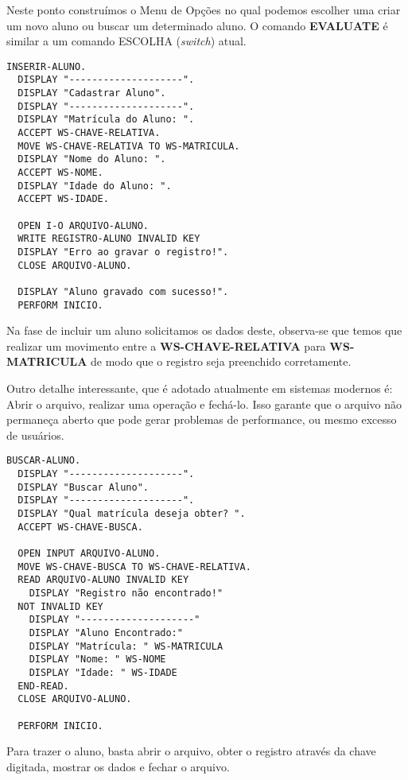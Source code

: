 Neste ponto construímos o Menu de Opções no qual podemos escolher uma criar um novo aluno ou buscar um determinado aluno. O comando \textbf{EVALUATE} é similar a um comando ESCOLHA (\textit{switch}) atual.

\begin{lstlisting}[]
INSERIR-ALUNO.
  DISPLAY "--------------------".
  DISPLAY "Cadastrar Aluno".
  DISPLAY "--------------------".
  DISPLAY "Matrícula do Aluno: ".
  ACCEPT WS-CHAVE-RELATIVA.
  MOVE WS-CHAVE-RELATIVA TO WS-MATRICULA.
  DISPLAY "Nome do Aluno: ".
  ACCEPT WS-NOME.
  DISPLAY "Idade do Aluno: ".
  ACCEPT WS-IDADE.

  OPEN I-O ARQUIVO-ALUNO.
  WRITE REGISTRO-ALUNO INVALID KEY
  DISPLAY "Erro ao gravar o registro!".
  CLOSE ARQUIVO-ALUNO.

  DISPLAY "Aluno gravado com sucesso!".
  PERFORM INICIO.	
\end{lstlisting}

Na fase de incluir um aluno solicitamos os dados deste, observa-se que temos que realizar um movimento entre a \textbf{WS-CHAVE-RELATIVA} para \textbf{WS-MATRICULA} de modo que o registro seja preenchido corretamente.

Outro detalhe interessante, que é adotado atualmente em sistemas modernos é: Abrir o arquivo, realizar uma operação e fechá-lo. Isso garante que o arquivo não permaneça aberto que pode gerar problemas de performance, ou mesmo excesso de usuários.

\begin{lstlisting}[]
BUSCAR-ALUNO.
  DISPLAY "--------------------".
  DISPLAY "Buscar Aluno".
  DISPLAY "--------------------".
  DISPLAY "Qual matrícula deseja obter? ".
  ACCEPT WS-CHAVE-BUSCA.

  OPEN INPUT ARQUIVO-ALUNO.
  MOVE WS-CHAVE-BUSCA TO WS-CHAVE-RELATIVA.
  READ ARQUIVO-ALUNO INVALID KEY
    DISPLAY "Registro não encontrado!"
  NOT INVALID KEY
    DISPLAY "--------------------"
    DISPLAY "Aluno Encontrado:"
    DISPLAY "Matrícula: " WS-MATRICULA
    DISPLAY "Nome: " WS-NOME
    DISPLAY "Idade: " WS-IDADE
  END-READ.
  CLOSE ARQUIVO-ALUNO.

  PERFORM INICIO.	
\end{lstlisting}

Para trazer o aluno, basta abrir o arquivo, obter o registro através da chave digitada, mostrar os dados e fechar o arquivo.

\clearpage